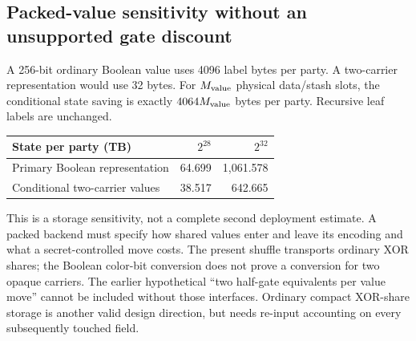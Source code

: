 \subsection{Packed-value sensitivity without an unsupported gate discount}
A 256-bit ordinary Boolean value uses 4096 label bytes per party. A
two-carrier representation would use 32 bytes. For $M_{\rm value}$ physical
data/stash slots, the conditional state saving is exactly
$4064M_{\rm value}$ bytes per party. Recursive leaf labels are unchanged.

\begin{center}\small
\begin{tabular}{lrr}\toprule
State per party (TB) & $2^{28}$ & $2^{32}$\\\midrule
Primary Boolean representation & 64.699 & 1,061.578\\
Conditional two-carrier values & 38.517 & 642.665\\
\bottomrule\end{tabular}
\end{center}

This is a storage sensitivity, not a complete second
deployment estimate. A packed backend must specify how shared values enter
and leave its encoding and what a secret-controlled move costs. The present
shuffle transports ordinary XOR shares; the Boolean color-bit conversion does
not prove a conversion for two opaque carriers. The earlier hypothetical
``two half-gate equivalents per value move'' cannot be included without those
interfaces. Ordinary compact XOR-share storage is another valid design
direction, but needs re-input accounting on every subsequently touched field.
